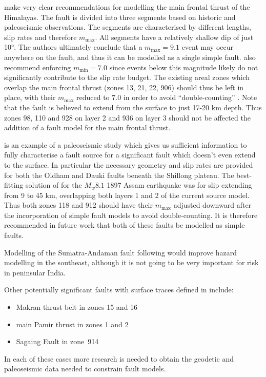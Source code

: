 \documentclass{article}
\begin{document}
\begin{appendices}
\citet{berryman2014himalayan} make very clear recommendations for modelling the main frontal thrust of the Himalayas.
The fault is divided into three segments based on historic and paleoseismic observations.
The segments are characterised by different lengths, slip rates and therefore $m_\text{max}$. 
All segments have a relatively shallow dip of just 10°.
The authors ultimately conclude that a $m_\text{max} = 9.1$ event may occur anywhere on the fault, and thus it can be modelled as a single simple fault.
\citet{berryman2014himalayan} also recommend enforcing $m_\text{min} = 7.0$ since events below this magnitude likely do not significantly contribute to the slip rate budget.
The existing areal zones which overlap the main frontal thrust (zones 13, 21, 22, 906) should thus be left in place, with their $m_\text{max}$ reduced to 7.0 in order to avoid ``double-counting'' \citep{ceus2012central}.
Note that the fault is believed to extend from the surface to just 17-20 km depth.
Thus zones 98, 110 and 928 on layer 2 and 936 on layer 3 should not be affected the addition of a fault model for the main frontal thrust.

\citet{bilham2001plateau} is an example of a paleoseismic study which gives us sufficient information to fully characterise a fault source for a significant fault which doesn't even extend to the surface.
In particular the necessary geometry and slip rates are provided for both the Oldham and Dauki faults beneath the Shillong plateau.
The best-fitting solution of \citet{bilham2001plateau} for the $M_w 8.1$ 1897 Assam earthquake was for slip extending from 9 to 45 km, overlapping both layers 1 and 2 of the current source model.
Thus both zones 118 and 912 should have their $m_\text{max}$ adjusted downward after the incorporation of simple fault models to avoid double-counting.
It is therefore recommended in future work that both of these faults be modelled as simple faults.

Modelling of the Sumatra-Andaman fault following \cite{hayes2012slab1} would improve hazard modelling in the southeast, although it is not going to be very important for risk in peninsular India.

Other potentially significant faults with surface traces defined in \cite{styron2010database} include:
\begin{itemize}
\item Makran thrust belt in zones 15 and 16
\item main Pamir thrust in zones 1 and 2
\item Sagaing Fault in zone~914
\end{itemize}  
In each of these cases more research is needed to obtain the geodetic and paleoseismic data needed to constrain fault models.


\end{appendices}
\end{document}
